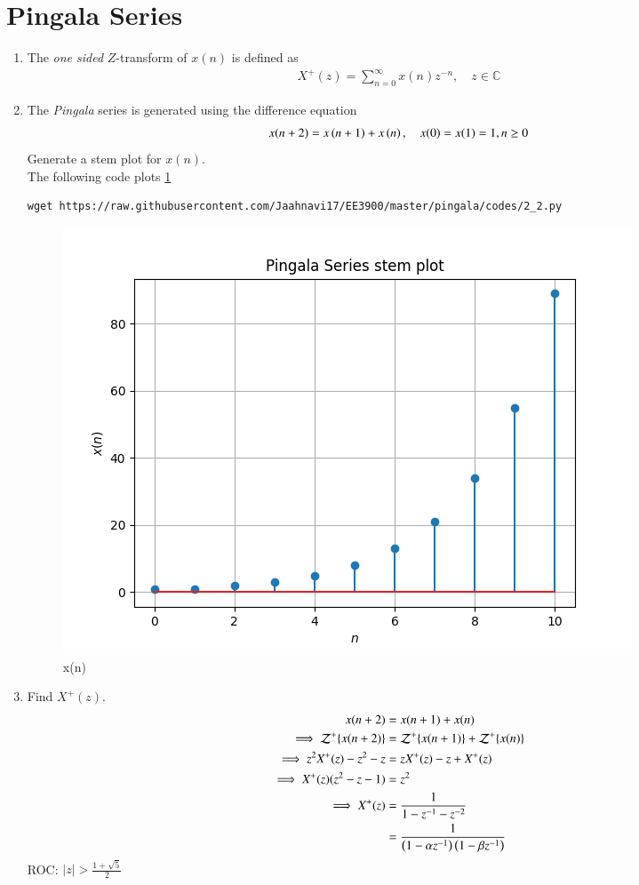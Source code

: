 \documentclass[journal,12pt,twocolumn]{IEEEtran}
\renewcommand\thesection{\arabic{section}}
\begin{document}
\section{Pingala Series}
\begin{enumerate}[label=\thesection.\arabic*,ref=\thesection.\theenumi]
\item The {\em one sided} $Z$-transform of $x(n)$ is defined as 
\begin{align}
	X^{+}(z) = \sum_{n = 0}^{\infty}x(n)z^{-n}, \quad z \in \mathbb{C}
\label{eq:one-Z}
\end{align}
	\item The {\em Pingala} series is generated using the difference equation 
\begin{align}
	x(n+2) = x\left(n+1\right) + x\left(n\right),  \quad x(0) = x(1) = 1, n \ge 0
	\label{eq:10-pingala}
\end{align}
Generate a stem plot for $x(n)$.\\
\solution The following code plots \ref{fig:xn}
	    \begin{lstlisting}
wget https://raw.githubusercontent.com/Jaahnavi17/EE3900/master/pingala/codes/2_2.py
\end{lstlisting}
\begin{figure}
    \centering
    \includegraphics[width=\columnwidth]{figures/2_2.png}
    \caption{x(n)}
    \label{fig:xn}
\end{figure}
\item 		Find $X^{+}(z)$.\\
\solution
\begin{align}
    x(n+2)&=x(n+1)+x(n)\\
    \implies \mathcal{Z}^{+}\{x(n+2)\}&=\mathcal{Z}^{+}\{x(n+1)\}+\mathcal{Z}^{+}\{x(n)\}\\
    \implies z^2X^{+}(z)-z^2-z&=zX^{+}(z)-z+X^{+}(z)\\
    \implies X^{+}(z)(z^2-z-1)&=z^2\\
    \implies X^{+}(z) &= \frac{1}{1-z^{-1}-z^{-2}}\\
    &= \frac{1}{\left(1-\alpha z^{-1}\right) \left(1-\beta z^{-1}\right)}
\end{align}
ROC: $|z|>\frac{1+\sqrt{5}}{2}$


\end{enumerate}
\end{document}
